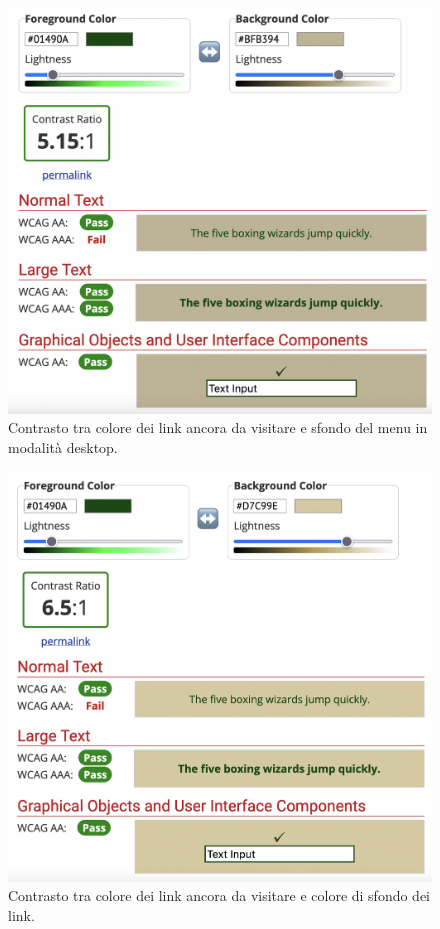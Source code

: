 \documentclass[a4paper]{article}
\begin{document}
	\begin{figure}[H]
		\centering
		\includegraphics[scale=0.3]{immagini/controllo-colori/light-mode/link-da-visitare_background-menu.png}
		\caption{Contrasto tra colore dei link ancora da visitare e sfondo del menu in modalità desktop.}
	\end{figure}

	\begin{figure}[H]
		\centering
		\includegraphics[scale=0.3]{immagini/controllo-colori/light-mode/link-da-visitare_sfondo-article-p.png}
		\caption{Contrasto tra colore dei link ancora da visitare e colore di sfondo dei link.}
	\end{figure}
\end{document}
